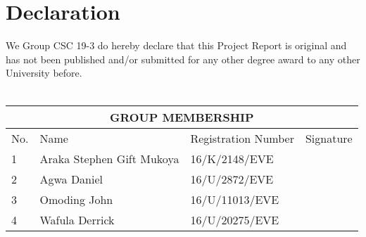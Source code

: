 \chapter*{Declaration}
We Group CSC 19-3 do hereby declare that this Project Report is original and has not been published and/or submitted for any other degree award to any other University before. \\~\\
\begin{tabular}{|p{0.5cm}|p{4.5cm} |p{4cm}|p{3cm}|}
\hline
\multicolumn{4}{|c|}{GROUP MEMBERSHIP}\\

\hline
No.&Name & Registration Number &Signature\\
\hline
1&Araka Stephen Gift Mukoya&16/K/2148/EVE&\\
\hline
2&Agwa Daniel&16/U/2872/EVE&\\
\hline
3&Omoding John&16/U/11013/EVE&\\
\hline
4&Wafula Derrick&16/U/20275/EVE&\\


\hline

\end{tabular}

\newpage